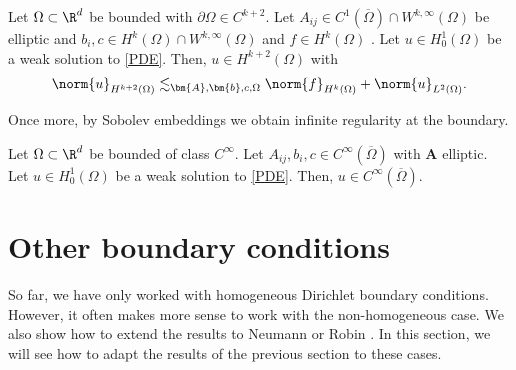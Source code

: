 \documentclass[
    a4paper,
    DIV=14,
    abstract=true,
    numbers=noenddot
]{scrartcl}
\begin{document}
\begin{theorem}\label{higher regularity boundary}
    Let $\Omega \subset \R^d$ be bounded with $ \partial \Omega  \in   C^{k+2}$. Let $A_{ij} \in C^1(\overline{\Omega})\cap W^{k, \infty}(\Omega)$ be elliptic and $b_i,c \in H^k(\Omega)\cap W^{k,\infty}(\Omega)$ and $f \in H^k(\Omega )$ . Let $u \in H^1_0(\Omega)$ be a weak solution to \eqref{PDE}. Then, $u \in H^{k+2}(\Omega)$ with
    \begin{align*}
        \norm{u}_{H^{k+2}(\Omega)} \lesssim_{\bm{A},\bm{b},c, \Omega } \norm{f}_{H^k(\Omega)}+\norm{u}_{L^2(\Omega)}.
    \end{align*}
\end{theorem}
Once more, by Sobolev embeddings we obtain infinite regularity at the boundary.
\begin{theorem}
    Let $\Omega \subset \R^d$ be bounded of class $C^{\infty}$. Let $A_{ij}, b_i,c \in C^{\infty}(\overline{\Omega})$ with $\bm{A}$ elliptic. Let $u \in H^1_0(\Omega)$ be a weak solution to \eqref{PDE}. Then, $u \in C^\infty(\overline{\Omega})$.
\end{theorem}

\section{Other boundary conditions}
So far, we have only worked with homogeneous Dirichlet boundary conditions. However, it often makes more sense to work with the non-homogeneous case. We also show how to extend the results to Neumann or Robin . In this section, we will see how to adapt the results of the previous section to these cases.
\end{document}
